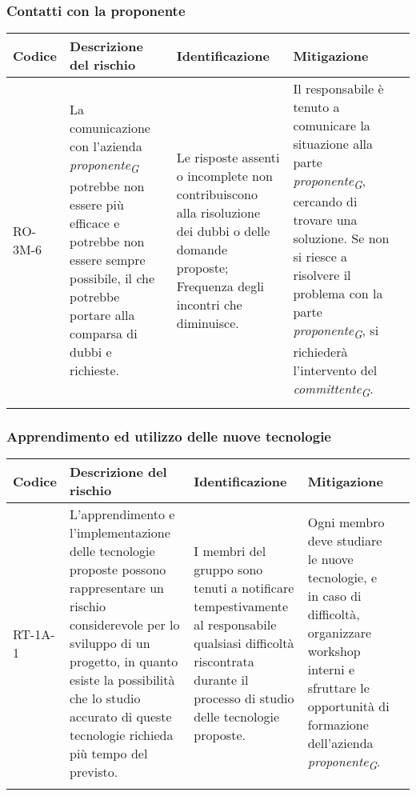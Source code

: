 \vspace{2cm}

\subsubsection{Contatti con la proponente} \label{subsubsec:contattiProponente}
\begin{table}[H]
    \centering
    \begin{tabularx}{\textwidth}{l>{\RaggedRight}X>{\RaggedRight}X>{\RaggedRight}X>{\RaggedRight}X}
    \toprule
    \rowcolor{gray!50}
    \textbf{Codice} & \textbf{Descrizione del rischio} & \textbf{Identificazione} & \textbf{Mitigazione} \\
    \midrule
    \addlinespace 
    RO-3M-6 & 
    La comunicazione con l'azienda \textit{proponente}\textsubscript{\textit{G}} potrebbe non essere più efficace e potrebbe non essere sempre possibile, il che potrebbe portare alla comparsa di dubbi e richieste. & Le risposte assenti o incomplete non contribuiscono alla risoluzione dei dubbi o delle domande proposte; Frequenza degli incontri che diminuisce. &
    Il responsabile è tenuto a comunicare la situazione alla parte \textit{proponente}\textsubscript{\textit{G}}, cercando di trovare una soluzione. Se non si riesce a risolvere il problema con la parte \textit{proponente}\textsubscript{\textit{G}}, si richiederà l’intervento del \textit{committente}\textsubscript{\textit{G}}. \\
    \bottomrule
    \addlinespace 
    \end{tabularx}
\end{table}

\subsubsection{Apprendimento ed utilizzo delle nuove tecnologie} \label{sec:rischioTec}
\begin{table}[H]
    \centering
    \begin{tabularx}{\textwidth}{l>{\RaggedRight}X>{\RaggedRight}X>{\RaggedRight}X>{\RaggedRight}X}
    \toprule
    \rowcolor{gray!50}
    \textbf{Codice} & \textbf{Descrizione del rischio} & \textbf{Identificazione} & \textbf{Mitigazione} \\
    \midrule
    \addlinespace 
    RT-1A-1 & 
    L’apprendimento e l'implementazione delle tecnologie proposte possono rappresentare un rischio considerevole per lo sviluppo di un progetto, in quanto esiste la possibilità che lo studio accurato di queste tecnologie richieda più tempo del previsto. & 
    I membri del gruppo sono tenuti a notificare tempestivamente al responsabile qualsiasi difficoltà riscontrata durante il processo di studio delle tecnologie proposte. &
    Ogni membro deve studiare le nuove tecnologie, e in caso di difficoltà, organizzare workshop interni e sfruttare le opportunità di formazione dell'azienda \textit{proponente}\textsubscript{\textit{G}}.\\
    \bottomrule
    \addlinespace 
    \end{tabularx}
\end{table}

